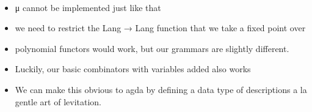 \begin{code}%
%
\>[4]\AgdaSpace{}%
\AgdaSpace{}%
\AgdaSymbol{:}\AgdaSpace{}%
\AgdaSymbol{(}\AgdaSpace{}%
\AgdaSpace{}%
\AgdaSymbol{)}\AgdaSpace{}%
\AgdaSpace{}%
\<%
\\
%
\>[4]\AgdaSpace{}%
\AgdaSymbol{=}\AgdaSpace{}%
\AgdaSpace{}%
\AgdaSpace{}%
\AgdaSpace{}%
\AgdaSpace{}%
\AgdaSpace{}%
\AgdaSpace{}%
\AgdaSpace{}%
\AgdaString{'['}\AgdaSpace{}%
\AgdaSpace{}%
\AgdaSpace{}%
\AgdaSpace{}%
\AgdaSpace{}%
\AgdaString{']'}\AgdaSpace{}%
\AgdaSpace{}%
\AgdaSpace{}%
\AgdaSpace{}%
\AgdaSymbol{)}\<%
\end{code}

\begin{itemize}
\item μ cannot be implemented just like that
\item we need to restrict the Lang → Lang function that we take a fixed point over
\item polynomial functors would work, but our grammars are slightly different.
\item Luckily, our basic combinators with variables added also works
\item We can make this obvious to agda by defining a data type of descriptions a la gentle art of levitation.
\end{itemize}

\endinput


